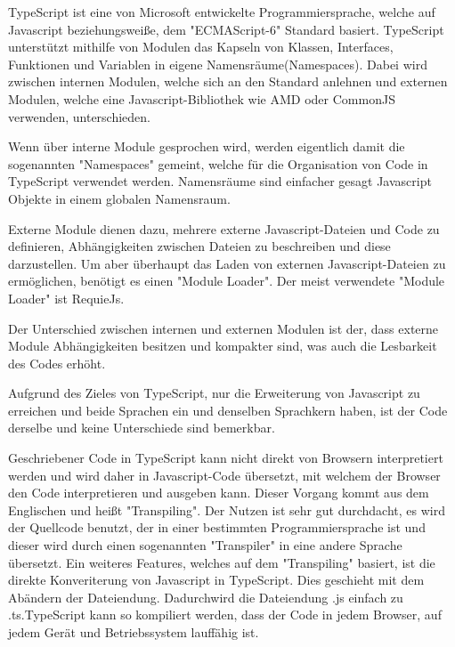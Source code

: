 \label{sec:TypeScript}

TypeScript ist eine von Microsoft entwickelte Programmiersprache, welche auf Javascript beziehungsweiße, dem "ECMAScript-6" Standard basiert. TypeScript unterstützt mithilfe von Modulen das Kapseln von Klassen, Interfaces, Funktionen und Variablen in eigene Namensräume(Namespaces). Dabei wird zwischen internen Modulen, welche sich an den Standard anlehnen und externen Modulen, welche eine Javascript-Bibliothek wie AMD oder CommonJS verwenden, unterschieden.\cite{TypeScript}

Wenn über interne Module gesprochen wird, werden eigentlich damit die sogenannten "Namespaces" gemeint, welche für die Organisation von Code in TypeScript verwendet werden. Namensräume sind einfacher gesagt Javascript Objekte in einem globalen Namensraum. \cite{IntModules}

Externe Module dienen dazu, mehrere externe Javascript-Dateien und Code zu definieren, Abhängigkeiten zwischen Dateien zu beschreiben und diese darzustellen. Um aber überhaupt das Laden von externen Javascript-Dateien zu ermöglichen, benötigt es einen "Module Loader". Der meist verwendete "Module Loader" ist RequieJs.\cite{ExtModules}

Der Unterschied zwischen internen und externen Modulen ist der, dass externe Module Abhängigkeiten besitzen und kompakter sind, was auch die Lesbarkeit des Codes erhöht.\cite{TypeScript}





Aufgrund des Zieles von TypeScript, nur die Erweiterung von Javascript zu erreichen und beide Sprachen ein und denselben Sprachkern haben, ist der Code derselbe und keine Unterschiede sind bemerkbar. 
\cite{TypeScript}


Geschriebener Code in TypeScript kann nicht direkt von Browsern interpretiert werden und wird daher in Javascript-Code übersetzt, mit welchem der Browser den Code interpretieren und ausgeben kann. Dieser Vorgang kommt aus dem Englischen und heißt "Transpiling". Der Nutzen ist sehr gut durchdacht, es wird der Quellcode benutzt, der in einer bestimmten Programmiersprache ist und dieser wird durch einen sogenannten "Transpiler" in eine andere Sprache übersetzt. Ein weiteres Features, welches auf dem "Transpiling" basiert, ist die direkte Konveriterung von Javascript in TypeScript. Dies geschieht mit dem Abändern der Dateiendung. Dadurchwird die Dateiendung .js einfach zu .ts.TypeScript kann so kompiliert werden, dass der Code in jedem Browser, auf jedem Gerät und Betriebssystem lauffähig ist. \cite{Differnces}


